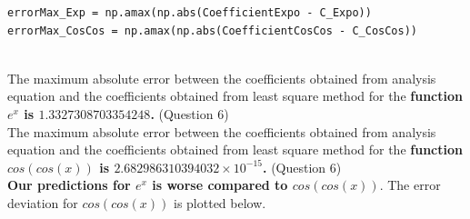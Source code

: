 \documentclass[12pt, a4paper]{report}
\begin{document}
\begin{verbatim}
errorMax_Exp = np.amax(np.abs(CoefficientExpo - C_Expo))
errorMax_CosCos = np.amax(np.abs(CoefficientCosCos - C_CosCos))
\end{verbatim}
\\

The maximum absolute error between the coefficients obtained from analysis equation and the coefficients obtained from least square method for the \textbf{function $e^x$ is
$1.3327308703354248$.} (Question 6)
\\

The maximum absolute error between the coefficients obtained from analysis equation and the coefficients obtained from least square method for the \textbf{function $cos(cos(x))$ is $2.682986310394032 \times 10^{-15}$. } (Question 6)
\\

\textbf{Our predictions for $e^x$ is worse compared to $cos(cos(x))$}.
The error deviation for $cos(cos(x))$ is plotted below.
\end{document}
